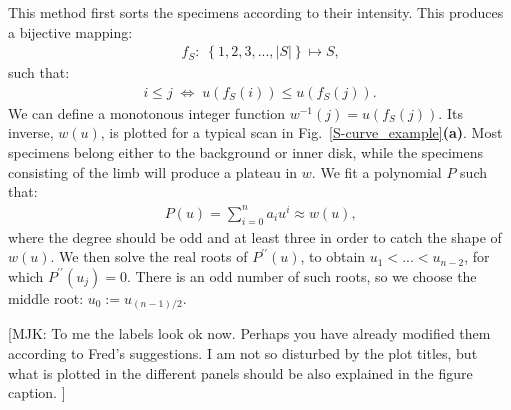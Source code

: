 \documentclass{aa}
\newcommand{\fag}[1]{\textcolor{midpurple}{[FAG: #1]}} %
\newcommand{\mjk}[1]{\textcolor{midgreen}{[MJK: #1]}} %
\newcommand{\eqnl}[2]{\begin{eqnarray}\label{#1}#2\end{eqnarray}}
\begin{document}
  This method first sorts the specimens according to their intensity.
  This produces a bijective mapping:
  \eqnl{scurve-mapping1}{
  f_S:\; \left\{ 1, 2, 3, ..., |S| \right\} \mapsto S \text{,}
  }
  such that:
  \eqnl{scurve-mapping2}{
  i \le j \; \Leftrightarrow \; u \left( f_S(i) \right) \le u \left( f_S(j) \right) \text{.} 
  }
  We can define a monotonous integer function $w^{-1}(j) = u(f_S(j))$.
  Its inverse, $w(u)$, is plotted for a typical scan in 
  Fig.~\ref{S-curve_example}{\bf(a)}. 
  Most specimens belong either to the background or inner disk, while the
  specimens consisting of the limb will produce a plateau in $w$.
  We fit a polynomial $P$ such that:
  \eqnl{scurve-approx}{
  P(u) = \sum \limits_{i=0}^{n} a_i u^i \approx w(u) \text{,}
  }
  where the degree should be odd and at least three in order to catch the shape
  of $w(u)$.
  We then solve the real roots of $P^{\prime\prime}(u)$, to obtain 
  $u_1 < ... < u_{n-2}$, for which $P^{\prime\prime}(u_j) = 0$.
  There is an odd number of such roots, so we choose the middle root:
  $u_0 := u_{{(n-1)}/{2}}$.
  
  \mjk{To me the labels look ok now. Perhaps you have already modified them according to Fred's suggestions. I am not so disturbed by the plot titles, but what is plotted in the different panels should be also explained in the figure caption. }
  
\end{document}

